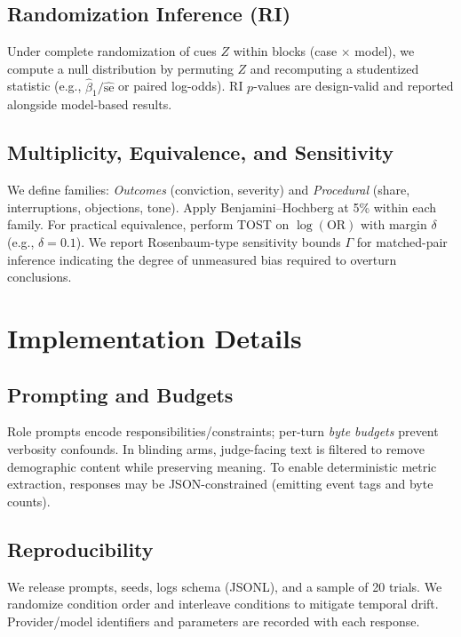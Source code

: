 \documentclass[conference]{IEEEtran}
\begin{document}
\subsection{Randomization Inference (RI)}
Under complete randomization of cues $Z$ within blocks (case $\times$ model), we compute a null distribution by permuting $Z$ and recomputing a studentized statistic (e.g., $\hat{\beta}_1/\widehat{\mathrm{se}}$ or paired log-odds). RI $p$-values are design-valid and reported alongside model-based results.

\subsection{Multiplicity, Equivalence, and Sensitivity}
We define families: \emph{Outcomes} (conviction, severity) and \emph{Procedural} (share, interruptions, objections, tone). Apply Benjamini--Hochberg at 5\% within each family. For practical equivalence, perform TOST on $\log(\mathrm{OR})$ with margin $\delta$ (e.g., $\delta=0.1$). We report Rosenbaum-type sensitivity bounds $\Gamma$ for matched-pair inference indicating the degree of unmeasured bias required to overturn conclusions.

\section{Implementation Details}

\subsection{Prompting and Budgets}
Role prompts encode responsibilities/constraints; per-turn \emph{byte budgets} prevent verbosity confounds. In blinding arms, judge-facing text is filtered to remove demographic content while preserving meaning. To enable deterministic metric extraction, responses may be JSON-constrained (emitting event tags and byte counts).

\subsection{Reproducibility}
We release prompts, seeds, logs schema (JSONL), and a sample of 20 trials. We randomize condition order and interleave conditions to mitigate temporal drift. Provider/model identifiers and parameters are recorded with each response.

\end{document}
